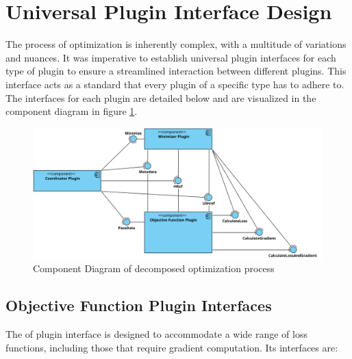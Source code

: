 \documentclass[
  a4paper,  %
  twoside,  %
  bibliography=totoc,
  headsepline,
  cleardoublepage=empty,
  parskip=half,
  draft=false
]{scrbook}
\begin{document}
\section{Universal Plugin Interface Design}

The process of optimization is inherently complex, with a multitude of variations and nuances.
It was imperative to establish universal plugin interfaces for each type of plugin to ensure a streamlined interaction between different plugins.
This interface acts as a standard that every plugin of a specific type has to adhere to.
The interfaces for each plugin are detailed below and are visualized in the component diagram in figure \ref{fig:component_diagram}.

\begin{figure}[ht]
    \centering
    \includegraphics[width=\textwidth]{graphics/plugin_decomposition.svg}
    \caption{Component Diagram of decomposed optimization process}
    \label{fig:component_diagram}
\end{figure}

\subsection{Objective Function Plugin Interfaces}

The \gls{of} plugin interface is designed to accommodate a wide range of loss functions, including those that require gradient computation.
Its interfaces are:
\end{document}
